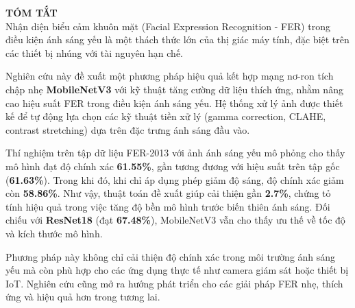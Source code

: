 {\LARGE \textbf{TÓM TẮT}} \\[1cm]

Nhận diện biểu cảm khuôn mặt (Facial Expression Recognition - FER) trong điều kiện ánh sáng yếu là một thách thức lớn của thị giác máy tính, đặc biệt trên các thiết bị nhúng với tài nguyên hạn chế.

Nghiên cứu này đề xuất một phương pháp hiệu quả kết hợp mạng nơ-ron tích chập nhẹ \textbf{MobileNetV3} với kỹ thuật tăng cường dữ liệu thích ứng, nhằm nâng cao hiệu suất FER trong điều kiện ánh sáng yếu. Hệ thống xử lý ảnh được thiết kế để tự động lựa chọn các kỹ thuật tiền xử lý (gamma correction, CLAHE, contrast stretching) dựa trên đặc trưng ánh sáng đầu vào.

Thí nghiệm trên tập dữ liệu FER-2013 với ảnh ánh sáng yếu mô phỏng cho thấy mô hình đạt độ chính xác \textbf{61.55\%}, gần tương đương với hiệu suất trên tập gốc (\textbf{61.63\%}). Trong khi đó, khi chỉ áp dụng phép giảm độ sáng, độ chính xác giảm còn \textbf{58.86\%}. Như vậy, thuật toán đề xuất giúp cải thiện gần \textbf{2.7\%}, chứng tỏ tính hiệu quả trong việc tăng độ bền mô hình trước biến thiên ánh sáng. Đối chiếu với \textbf{ResNet18} (đạt \textbf{67.48\%}), MobileNetV3 vẫn cho thấy ưu thế về tốc độ và kích thước mô hình.

Phương pháp này không chỉ cải thiện độ chính xác trong môi trường ánh sáng yếu mà còn phù hợp cho các ứng dụng thực tế như camera giám sát hoặc thiết bị IoT. Nghiên cứu cũng mở ra hướng phát triển cho các giải pháp FER nhẹ, thích ứng và hiệu quả hơn trong tương lai.